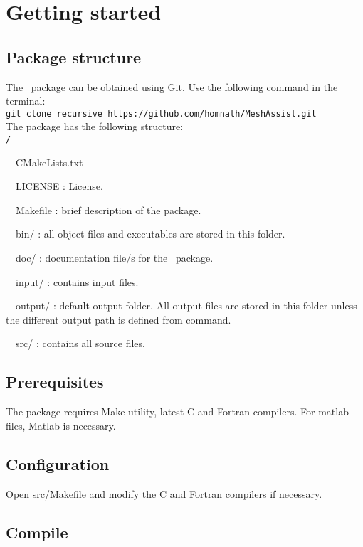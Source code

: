 \chapter{Getting started}
\label{chap:start}
\section{Package structure}
The \pack\ package can be obtained using Git. Use the following command in the terminal:\\

\texttt{git clone \-\-recursive https://github.com/homnath/MeshAssist.git}\\

The package has the following structure:\\

\texttt{\pack/}
\begin{adescription}{~~CMakeLists.txt}
\item[~~LICENSE]               : License.
\item[~~Makefile]                : brief description of the package.
\item[~~bin/]                  : all object files and executables are stored in this folder.
\item[~~doc/]                  : documentation file/s for the \pack\ package.
\item[~~input/]                : contains input files.
\item[~~output/]               : default output folder. All output files are stored in this folder unless the different output path is defined from command.
\item[~~src/]                  : contains all source files.
\end{adescription}
 
\section{Prerequisites}

The package requires Make utility, latest C and Fortran compilers. For matlab files, Matlab is necessary.

\section{Configuration}

Open src/Makefile and modify the C and Fortran compilers if necessary.

\section{Compile}

